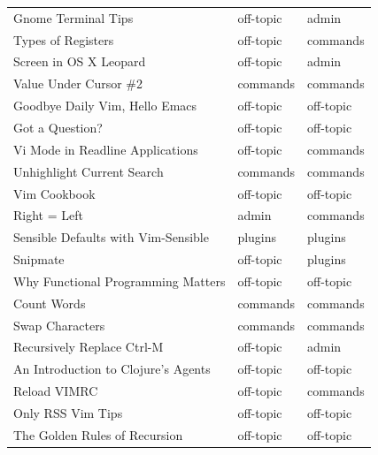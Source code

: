 \documentclass[12pt, a4paper]{article}
\begin{document}
\begin{longtable}{lll}
 Gnome Terminal Tips                         & off-topic   & admin     \\
 Types of Registers                          & off-topic   & commands  \\
 Screen in OS X Leopard                      & off-topic   & admin     \\
 Value Under Cursor \#2                       & commands    & commands  \\
 Goodbye Daily Vim, Hello Emacs              & off-topic   & off-topic \\
 Got a Question?                             & off-topic   & off-topic \\
 Vi Mode in Readline Applications            & off-topic   & commands  \\
 Unhighlight Current Search                  & commands    & commands  \\
 Vim Cookbook                                & off-topic   & off-topic \\
 Right = Left                                & admin       & commands  \\
 Sensible Defaults with Vim-Sensible         & plugins     & plugins   \\
 Snipmate                                    & off-topic   & plugins   \\
 Why Functional Programming Matters          & off-topic   & off-topic \\
 Count Words                                 & commands    & commands  \\
 Swap Characters                             & commands    & commands  \\
 Recursively Replace Ctrl-M                  & off-topic   & admin     \\
 An Introduction to Clojure's Agents         & off-topic   & off-topic \\
 Reload VIMRC                                & off-topic   & commands  \\
 Only RSS Vim Tips                           & off-topic   & off-topic \\
 The Golden Rules of Recursion               & off-topic   & off-topic \\
\hline
\end{longtable}

\newpage
\end{document}

